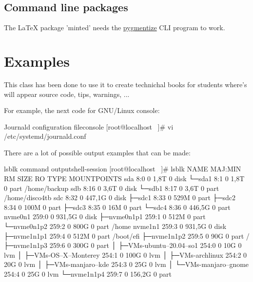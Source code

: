 \documentclass{yukibook}
\begin{document}
\section{Command line packages}
The \LaTeX{} package 'minted' needs the \href{https://pygments.org/}{pygmentize} CLI program to work.


\chapter{Examples}
This class has been done to use it to create technichal books for students where's will appear source code, tips, warnings, ...

For example, the next code for GNU/Linux console:

\begin{mycode}{Journald configuration file}{console}{}
[root@localhost ~]# vi /etc/systemd/journald.conf
\end{mycode}

There are a lot of possible output examples that can be made:

\begin{mycode}{lsblk command output}{shell-session}{}
[root@localhost ~]# lsblk
NAME                       MAJ:MIN RM   SIZE RO TYPE MOUNTPOINTS
sda                          8:0    0   1,8T  0 disk
└─sda1                       8:1    0   1,8T  0 part /home/backup
sdb                          8:16   0   3,6T  0 disk
└─sdb1                       8:17   0   3,6T  0 part /home/disco4tb
sdc                          8:32   0 447,1G  0 disk
├─sdc1                       8:33   0   529M  0 part
├─sdc2                       8:34   0   100M  0 part
├─sdc3                       8:35   0    16M  0 part
└─sdc4                       8:36   0 446,5G  0 part
nvme0n1                    259:0    0 931,5G  0 disk
├─nvme0n1p1                259:1    0   512M  0 part
└─nvme0n1p2                259:2    0   800G  0 part /home
nvme1n1                    259:3    0 931,5G  0 disk
├─nvme1n1p1                259:4    0   512M  0 part /boot/efi
├─nvme1n1p2                259:5    0    90G  0 part /
├─nvme1n1p3                259:6    0   300G  0 part
│ ├─VMs-ubuntu--20.04--so1 254:0    0    10G  0 lvm
│ ├─VMs-OS--X--Monterey    254:1    0   100G  0 lvm
│ ├─VMs-archlinux          254:2    0    20G  0 lvm
│ ├─VMs-manjaro--kde       254:3    0    25G  0 lvm
│ └─VMs-manjaro--gnome     254:4    0    25G  0 lvm
└─nvme1n1p4                259:7    0 156,2G  0 part
\end{mycode}
\end{document}

